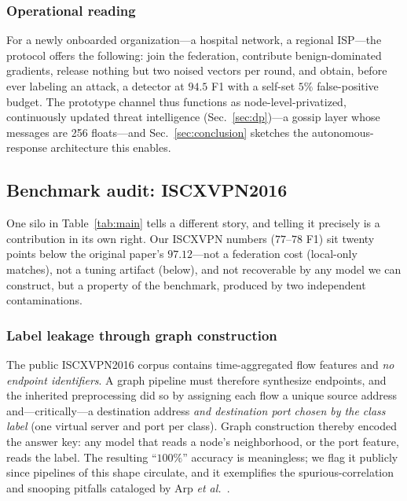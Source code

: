 \documentclass[journal]{IEEEtran}
\begin{document}
\subsubsection{Operational reading}
For a newly onboarded organization---a hospital network, a regional
ISP---the protocol offers the following: join the federation,
contribute benign-dominated gradients, release nothing but two noised
vectors per round, and obtain, before ever labeling an attack, a
detector at $94.5$ F1 with a self-set $5\%$ false-positive budget.
The prototype channel thus functions as node-level-privatized,
continuously updated threat intelligence (Sec.~\ref{sec:dp})---a
gossip layer whose messages are 256 floats---and
Sec.~\ref{sec:conclusion} sketches the autonomous-response architecture
this enables.

\subsection{Benchmark audit: ISCXVPN2016}
\label{sec:audit}

One silo in Table~\ref{tab:main} tells a different story, and telling
it precisely is a contribution in its own right. Our ISCXVPN numbers
($77$--$78$ F1) sit twenty points below the original paper's
$97.12$---not a federation cost (local-only matches), not a tuning
artifact (below), and not recoverable by any model we can construct,
but a property of the benchmark, produced by two independent
contaminations.

\subsubsection{Label leakage through graph construction}
The public ISCXVPN2016 corpus contains time-aggregated flow features
and \emph{no endpoint identifiers}. A graph pipeline must therefore
synthesize endpoints, and the inherited preprocessing did so by
assigning each flow a unique source address and---critically---a
destination address \emph{and destination port chosen by the class
label} (one virtual server and port per class). Graph construction
thereby encoded the answer key: any model that reads a node's
neighborhood, or the port feature, reads the label. The resulting
``$100\%$'' accuracy is meaningless; we flag it publicly since
pipelines of this shape circulate, and it exemplifies the
spurious-correlation and snooping pitfalls cataloged by Arp \emph{et
al.}~\cite{arp}.
\end{document}

